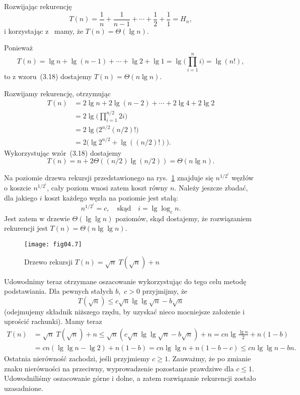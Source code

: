 \subproblem %
Rozwijając rekurencję
\[
	T(n) = \frac{1}{n}+\frac{1}{n-1}+\cdots+\frac{1}{2}+\frac{1}{1} = H_n,
\]
i korzystając z~ mamy, że $T(n)=\Theta(\lg n)$.

\subproblem %
Ponieważ
\[
	T(n) = \lg n+\lg(n-1)+\cdots+\lg2+\lg 1 = \lg\biggl(\prod_{i=1}^ni\biggr) = \lg(n!),
\]
to z wzoru~(3.18) dostajemy $T(n)=\Theta(n\lg n)$.

\subproblem %
Rozwijamy rekurencję, otrzymując
\begin{align*}
	T(n) &= 2\lg n+2\lg(n-2)+\cdots+2\lg4+2\lg2 \\
	&= 2\lg\biggl(\prod_{i=1}^{n/2}2i\biggr) \\
	&= 2\lg\bigl(2^{n/2}(n/2)!\bigr) \\
	&= 2\bigl(\lg 2^{n/2}+\lg((n/2)!)\bigr).
\end{align*}
Wykorzystując wzór~(3.18) dostajemy
\[
	T(n) = n+2\Theta((n/2)\lg (n/2)) = \Theta(n\lg n).
\]

\subproblem %
Na  poziomie drzewa rekursji przedstawionego na rys.~\ref{fig:4-4j} znajduje się $n^{1/2^i}$ węzłów o koszcie $n^{1/2^i}$, cały poziom wnosi zatem koszt równy $n$. Należy jeszcze zbadać, dla jakiego $i$ koszt każdego węzła na  poziomie jest stałą:
\[
	n^{1/2^i} = c, \quad\text{skąd}\quad i = \lg\log_cn.
\]
Jest zatem w drzewie $\Theta(\lg\lg n)$ poziomów, skąd dostajemy, że rozwiązaniem rekurencji jest $T(n)=\Theta(n\lg\lg n)$.
\begin{figure}[ht]
	\begin{center}
		\texttt{[image: fig04.7]}
	\caption{Drzewo rekursji $T(n)=\sqrt{n}\;T(\!\sqrt{n})+n$} \label{fig:4-4j}
	\end{center}
\end{figure}

Udowodnimy teraz otrzymane oszacowanie wykorzystując do tego celu metodę podstawiania. Dla pewnych stałych $b$,~$c>0$ przyjmijmy, że
\[
	T(\!\sqrt{n}) \le c\sqrt{n}\lg\lg\sqrt{n}-b\sqrt{n}
\]
(odejmujemy składnik niższego rzędu, by uzyskać nieco mocniejsze założenie i uprościć rachunki). Mamy teraz
\begin{align*}
	T(n) &= \sqrt{n}\;T(\!\sqrt{n})+n \le \sqrt{n}\left(c\sqrt{n}\lg\lg\sqrt{n}-b\sqrt{n}\right)+n = cn\lg\frac{\lg n}{2}+n(1-b) \\
	&= cn(\lg\lg n-\lg2)+n(1-b) = cn\lg\lg n+n(1-b-c) \le cn\lg\lg n-bn.
\end{align*}
Ostatnia nierówność zachodzi, jeśli przyjmiemy $c\ge1$. Zauważmy, że po zmianie znaku nierówności na przeciwny, wyprowadzenie pozostanie prawdziwe dla $c\le1$. Udowodniliśmy oszacowanie górne i dolne, a zatem rozwiązanie rekurencji zostało uzasadnione.

